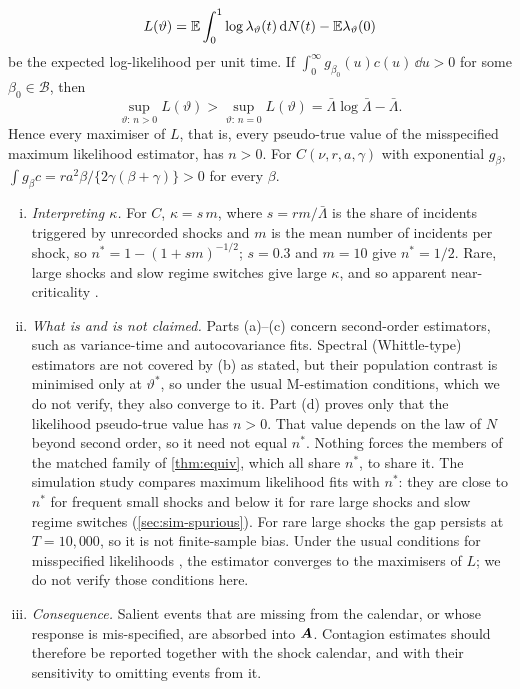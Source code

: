 \begin{theorem}
\begin{enumerate}[(a)]
  \[
  L(\vartheta)=\mathbb{E}\int_0^1\log\lambda_\vartheta(t)\,\mathrm{d}N(t)-\mathbb{E}\lambda_\vartheta(0)
  \]
  be the expected log-likelihood per unit time. If $\int_0^\infty g_{\beta_0}(u)c(u)\,\dd u>0$
  for some $\beta_0\in\mathcal B$, then
  \[
  \sup_{\vartheta:\,n>0}L(\vartheta)>\sup_{\vartheta:\,n=0}L(\vartheta)=\bar\Lambda\log\bar\Lambda-\bar\Lambda .
  \]
  Hence every maximiser of $L$, that is, every pseudo-true value of the misspecified
  maximum likelihood estimator, has $n>0$. For $C(\nu,r,a,\gamma)$ with exponential
  $g_\beta$, $\int g_\beta c=r a^2\beta/\{2\gamma(\beta+\gamma)\}>0$ for every $\beta$.
\end{enumerate}
\end{theorem}

\begin{remark}\label{rem:th-spurious}
\begin{enumerate}[(i)]
  \item \emph{Interpreting $\kappa$.} For $C$, $\kappa=s\,m$, where $s=r m/\bar\Lambda$
  is the share of incidents triggered by unrecorded shocks and $m$ is the mean number
  of incidents per shock, so $n^*=1-(1+sm)^{-1/2}$; $s=0.3$ and $m=10$ give $n^*=1/2$.
  Rare, large shocks and slow regime switches give large $\kappa$, and so apparent
  near-criticality \citep{filimonov2015}.
  \item \emph{What is and is not claimed.} Parts (a)--(c) concern second-order
  estimators, such as variance-time and autocovariance fits. Spectral (Whittle-type)
  estimators \citep{cheysson2022} are not covered by (b) as stated, but their population
  contrast is minimised only at $\vartheta^*$, so under the usual M-estimation conditions,
  which we do not verify, they also converge to it. Part (d) proves
  only that the likelihood pseudo-true value has $n>0$. That value depends on the law
  of $N$ beyond second order, so it need not equal $n^*$. Nothing forces the members of
  the matched family of \cref{thm:equiv}, which all share $n^*$, to share it. The
  simulation study compares maximum likelihood fits with $n^*$: they are close to $n^*$
  for frequent small shocks and below it for rare large shocks and slow regime switches
  (\cref{sec:sim-spurious}). For rare large shocks the gap persists at $T=10{,}000$, so
  it is not finite-sample bias.
  Under the usual conditions for misspecified likelihoods \citep{white1982,ogata1978},
  the estimator converges to the maximisers of $L$; we do not verify those conditions
  here.
  \item \emph{Consequence.} Salient events that are missing from the calendar, or whose
  response is mis-specified, are absorbed into $\bm{A}$. Contagion estimates should
  therefore be reported together with the shock calendar, and with their sensitivity to
  omitting events from it.
\end{enumerate}
\end{remark}

